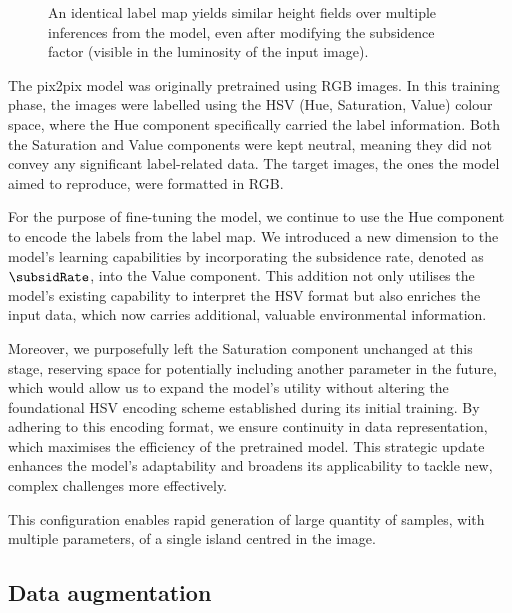 \begin{figure}
    \caption[Multiple islands generated with two subsidence values]{An identical label map yields similar height fields over multiple inferences from the model, even after modifying the subsidence factor (visible in the luminosity of the input image).}
    \label{fig:coral-island-results-subsidence}
\end{figure}

The pix2pix model was originally pretrained using RGB images. In this training phase, the images were labelled using the HSV (Hue, Saturation, Value) colour space, where the Hue component specifically carried the label information. Both the Saturation and Value components were kept neutral, meaning they did not convey any significant label-related data. The target images, the ones the model aimed to reproduce, were formatted in RGB.

For the purpose of fine-tuning the model, we continue to use the Hue component to encode the labels from the label map. We introduced a new dimension to the model's learning capabilities by incorporating the subsidence rate, denoted as $\subsidRate$, into the Value component. This addition not only utilises the model's existing capability to interpret the HSV format but also enriches the input data, which now carries additional, valuable environmental information.

Moreover, we purposefully left the Saturation component unchanged at this stage, reserving space for potentially including another parameter in the future, which would allow us to expand the model's utility without altering the foundational HSV encoding scheme established during its initial training. By adhering to this encoding format, we ensure continuity in data representation, which maximises the efficiency of the pretrained model. This strategic update enhances the model's adaptability and broadens its applicability to tackle new, complex challenges more effectively.

This configuration enables rapid generation of large quantity of samples, with multiple parameters, of a single island centred in the image.

\subsection{Data augmentation}
\label{sec:coral-island-data-augmentation}

